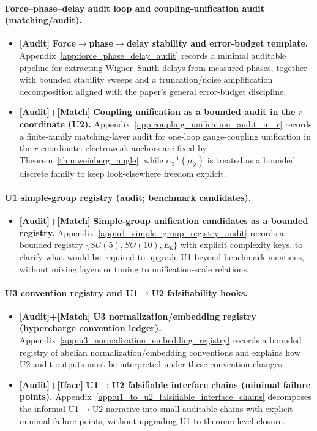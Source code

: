 \paragraph{Force--phase--delay audit loop and coupling-unification audit (matching/audit).}
\begin{itemize}
\item \textbf{[Audit]} \textbf{Force$\to$phase$\to$delay stability and error-budget template.}
Appendix~\ref{app:force_phase_delay_audit} records a minimal auditable pipeline for extracting Wigner--Smith delays from measured phases, together with bounded stability sweeps and a truncation/noise amplification decomposition aligned with the paper's general error-budget discipline.
\item \textbf{[Audit]+[Match]} \textbf{Coupling unification as a bounded audit in the $r$ coordinate (U2).}
Appendix~\ref{app:coupling_unification_audit_in_r} records a finite-family matching-layer audit for one-loop gauge-coupling unification in the $r$ coordinate: electroweak anchors are fixed by Theorem~\ref{thm:weinberg_angle}, while $\alpha_3^{-1}(\mu_Z)$ is treated as a bounded discrete family to keep look-elsewhere freedom explicit.
\end{itemize}

\paragraph{U1 simple-group registry (audit; benchmark candidates).}
\begin{itemize}
\item \textbf{[Audit]+[Match]} \textbf{Simple-group unification candidates as a bounded registry.}
Appendix~\ref{app:u1_simple_group_registry_audit} records a bounded registry $\{SU(5),SO(10),E_6\}$ with explicit complexity keys, to clarify what would be required to upgrade U1 beyond benchmark mentions, without mixing layers or tuning to unification-scale relations.
\end{itemize}

\paragraph{U3 convention registry and U1$\to$U2 falsifiability hooks.}
\begin{itemize}
\item \textbf{[Audit]+[Match]} \textbf{U3 normalization/embedding registry (hypercharge convention ledger).}
Appendix~\ref{app:u3_normalization_embedding_registry} records a bounded registry of abelian normalization/embedding conventions and explains how U2 audit outputs must be interpreted under these convention changes.
\item \textbf{[Audit]+[Iface]} \textbf{U1$\to$U2 falsifiable interface chains (minimal failure points).}
Appendix~\ref{app:u1_to_u2_falsifiable_interface_chains} decomposes the informal U1$\to$U2 narrative into small auditable chains with explicit minimal failure points, without upgrading U1 to theorem-level closure.
\end{itemize}

